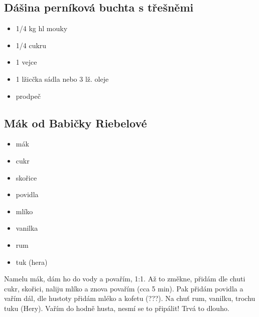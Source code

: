 \documentclass[10pt,a4paper]{article}
\newenvironment{myitemize}
{ \begin{itemize}
    \setlength{\itemsep}{0pt}
    \setlength{\parskip}{0pt}
    \setlength{\parsep}{0pt}     }
{ \end{itemize}                  }
\begin{document}
\subsection{Dášina perníková buchta s třešněmi}
\begin{minipage}[t]{0,5\textwidth}
\begin{myitemize} 
\item 1/4 kg hl mouky
\item 1/4 cukru
\item 1 vejce
\item 1 lžicčka sádla nebo 3 lž. oleje
\item prodpeč
\end{myitemize}
\end{minipage}
\begin{minipage}[t]{0,5\textwidth}

\end{minipage}
\subsection{Mák od Babičky Riebelové}
\begin{minipage}[t]{0,5\textwidth}
\begin{myitemize} 
\item mák
\item cukr
\item skořice
\item povidla
\item mlíko
\item vanilka
\item rum
\item tuk (hera)
\end{myitemize}
\end{minipage}
\begin{minipage}[t]{0,5\textwidth}
Namelu mák, dám ho do vody a povařím, 1:1. Až to změkne, přidám dle chuti cukr, skořici, naliju mlíko a znova povařím (cca 5 min). Pak přidám povidla a vařím dál, dle hustoty přidám mléko a kofetu (???). Na chuť rum, vanilku, trochu tuku (Hery). Vařím do hodně husta, nesmí se to připálit! Trvá to dlouho. 
\end{minipage}
\end{document}
